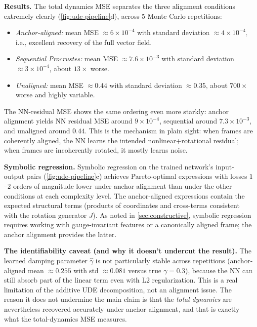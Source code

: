 \documentclass{article}
\theoremstyle{plain}
\theoremstyle{definition}
\theoremstyle{remark}
\begin{document}
\textbf{Results.}
The total dynamics MSE separates the three alignment conditions extremely clearly (\cref{fig:ude-pipeline}d), across 5 Monte Carlo repetitions:

\begin{itemize}
\item \emph{Anchor-aligned:} mean MSE $\approx 6 \times 10^{-4}$ with standard deviation $\approx 4 \times 10^{-4}$, i.e., excellent recovery of the full vector field.
\item \emph{Sequential Procrustes:} mean MSE $\approx 7.6 \times 10^{-3}$ with standard deviation $\approx 3 \times 10^{-4}$, about $13\times$ worse.
\item \emph{Unaligned:} mean MSE $\approx 0.44$ with standard deviation $\approx 0.35$, about $700\times$ worse and highly variable.
\end{itemize}

The NN-residual MSE shows the same ordering even more starkly: anchor alignment yields NN residual MSE around $9 \times 10^{-4}$, sequential around $7.3 \times 10^{-3}$, and unaligned around $0.44$.
This is the mechanism in plain sight: when frames are coherently aligned, the NN learns the intended nonlinear+rotational residual; when frames are incoherently rotated, it mostly learns noise.

\textbf{Symbolic regression.}
Symbolic regression on the trained network's input-output pairs (\cref{fig:ude-pipeline}c) achieves Pareto-optimal expressions with losses $1$--$2$ orders of magnitude lower under anchor alignment than under the other conditions at each complexity level.
The anchor-aligned expressions contain the expected structural terms (products of coordinates and cross-terms consistent with the rotation generator $J$).
As noted in \cref{sec:constructive}, symbolic regression requires working with gauge-invariant features or a canonically aligned frame; the anchor alignment provides the latter.

\textbf{The identifiability caveat (and why it doesn't undercut the result).}
The learned damping parameter $\hat{\gamma}$ is not particularly stable across repetitions (anchor-aligned mean $\approx 0.255$ with std $\approx 0.081$ versus true $\gamma=0.3$), because the NN can still absorb part of the linear term even with L2 regularization.
This is a real limitation of the additive UDE decomposition, not an alignment issue.
The reason it does not undermine the main claim is that the \emph{total dynamics} are nevertheless recovered accurately under anchor alignment, and that is exactly what the total-dynamics MSE measures.
\end{document}
